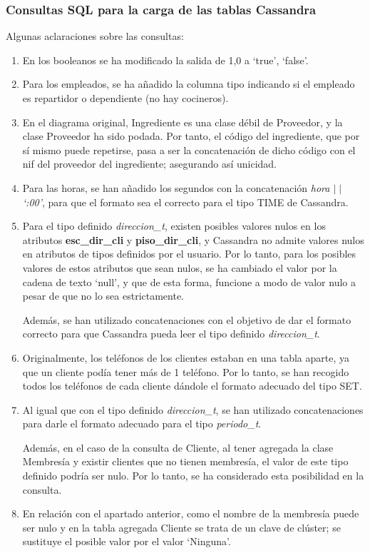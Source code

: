 \documentclass[a4paper]{article}
\begin{document}
\newpage

\subsubsection{\Large{Consultas SQL para la carga de las tablas Cassandra}}

Algunas aclaraciones sobre las consultas:

\begin{enumerate}
    \item En los booleanos se ha modificado la salida de {1,0} a {`true', `false'}.
    \item Para los empleados, se ha añadido la columna tipo indicando si el empleado es repartidor o dependiente (no hay cocineros).
    \item En el diagrama original, Ingrediente es una clase débil de Proveedor, y la clase Proveedor ha sido podada. Por tanto, el código del ingrediente, que por sí mismo puede repetirse, pasa a ser la concatenación de dicho código con el nif del proveedor del ingrediente; asegurando así unicidad.
    \item Para las horas, se han añadido los segundos con la concatenación \emph{hora $\mid \mid$ `:00'}, para que el formato sea el correcto para el tipo TIME de Cassandra.
    \item Para el tipo definido \emph{direccion\_t}, existen posibles valores nulos en los atributos \textbf{esc\_dir\_cli} y \textbf{piso\_dir\_cli}, y Cassandra no admite valores nulos en atributos de tipos definidos por el usuario. Por lo tanto, para los posibles valores de estos atributos que sean nulos, se ha cambiado el valor por la cadena de texto `null', y que de esta forma, funcione a modo de valor nulo a pesar de que no lo sea estrictamente.
    
    Además, se han utilizado concatenaciones con el objetivo de dar el formato correcto para que Cassandra pueda leer el tipo definido \emph{direccion\_t}.
    \item Originalmente, los teléfonos de los clientes estaban en una tabla aparte, ya que un cliente podía tener más de 1 teléfono. Por lo tanto, se han recogido todos los teléfonos de cada cliente dándole el formato adecuado del tipo SET.
    \item Al igual que con el tipo definido \emph{direccion\_t}, se han utilizado concatenaciones para darle el formato adecuado para el tipo \emph{periodo\_t}.
    
    Además, en el caso de la consulta de Cliente, al tener agregada la clase Membresía y existir clientes que no tienen membresía, el valor de este tipo definido podría ser nulo. Por lo tanto, se ha considerado esta posibilidad en la consulta.
    \item En relación con el apartado anterior, como el nombre de la membresía puede ser nulo y en la tabla agregada Cliente se trata de un clave de clúster; se sustituye el posible valor por el valor `Ninguna'.
    
\end{enumerate}
\end{document}
